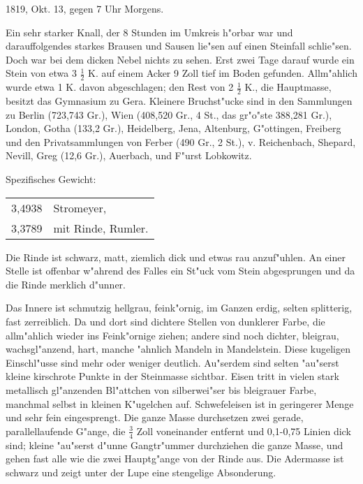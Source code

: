 \documentclass[a4paper, 11pt, oneside]{article}
\begin{document}
1819, Okt. 13, gegen 7 Uhr Morgens.

Ein sehr starker Knall, der 8 Stunden im Umkreis h"orbar war und darauffolgendes starkes Brausen und Sausen lie"sen auf einen Steinfall schlie"sen. Doch war bei dem dicken Nebel nichts zu sehen. Erst zwei Tage darauf wurde ein Stein von etwa 3 $\mathfrak{\frac{1}{2}}$ K. auf einem Acker 9 Zoll tief im Boden gefunden. Allm"ahlich wurde etwa 1 K. davon abgeschlagen; den Rest von 2 $\mathfrak{\frac{1}{2}}$ K., die Hauptmasse, besitzt das Gymnasium zu Gera. Kleinere Bruchst"ucke sind in den Sammlungen zu Berlin (723,743 Gr.), Wien (408,520 Gr., 4 St., das gr"o"ste 388,281 Gr.), London, Gotha (133,2 Gr.), Heidelberg, Jena, Altenburg, G"ottingen, Freiberg und den Privatsammlungen von Ferber (490 Gr., 2 St.), v. Reichenbach, Shepard, Nevill, Greg (12,6 Gr.), Auerbach, und F"urst Lobkowitz.

Spezifisches Gewicht:
\begin{table}[!ht]
    \centering\swabfamily\Large
    \begin{tabular}{l l}
        3,4938 & Stromeyer,\\
        3,3789 & mit Rinde, Rumler.
    \end{tabular}
\end{table}

Die Rinde ist schwarz, matt, ziemlich dick und etwas rau anzuf"uhlen. An einer Stelle ist offenbar w"ahrend des Falles ein St"uck vom Stein abgesprungen und da die Rinde merklich d"unner.

Das Innere ist schmutzig hellgrau, feink"ornig, im Ganzen erdig, selten splitterig, fast zerreiblich. Da und dort sind dichtere Stellen von dunklerer Farbe, die allm"ahlich wieder ins Feink"ornige ziehen; andere sind noch dichter, bleigrau, wachsgl"anzend, hart, manche "ahnlich Mandeln in Mandelstein. Diese kugeligen Einschl"usse sind mehr oder weniger deutlich. Au"serdem sind selten "au"serst kleine kirschrote Punkte in der Steinmasse sichtbar. Eisen tritt in vielen stark metallisch gl"anzenden Bl"attchen von silberwei"ser bis bleigrauer Farbe, manchmal selbst in kleinen K"ugelchen auf. Schwefeleisen ist in geringerer Menge und sehr fein eingesprengt. Die ganze Masse durchsetzen zwei gerade, parallellaufende G"ange, die $\mathfrak{\frac{3}{4}}$ Zoll voneinander entfernt und 0,1-0,75 Linien dick sind; kleine "au"serst d"unne Gangtr"ummer durchziehen die ganze Masse, und gehen fast alle wie die zwei Hauptg"ange von der Rinde aus. Die Adermasse ist schwarz und zeigt unter der Lupe eine stengelige Absonderung.
\end{document}
